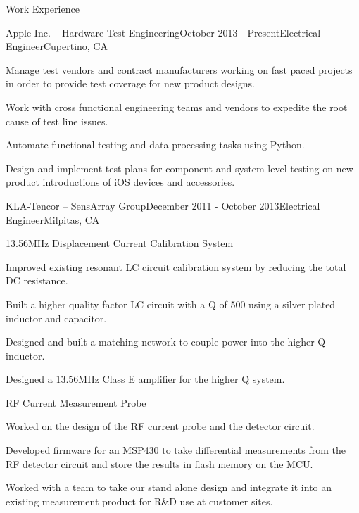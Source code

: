 \documentclass{resume} %
\begin{document}
\pagebreak[3]
\begin{rSection}{Work Experience}
\begin{rSubsection}{Apple Inc. -- Hardware Test Engineering}{October 2013 - Present}{Electrical Engineer}{Cupertino, CA}
\item Manage test vendors and contract manufacturers working on fast paced projects in order to provide test coverage for new product designs.
\item Work with cross functional engineering teams and vendors to expedite the root cause of test line issues.
\item Automate functional testing and data processing tasks using Python.
\item Design and implement test plans for component and system level testing on new product introductions of iOS devices and accessories.
\end{rSubsection}


\begin{rSubsection2}{KLA-Tencor -- SensArray Group}{December 2011 - October 2013}{Electrical Engineer}{Milpitas, CA}

\pagebreak[3]
\begin{rWorkProject}{13.56MHz Displacement Current Calibration System}
\item Improved existing resonant LC circuit calibration system by reducing the total DC resistance.
\item Built a higher quality factor LC circuit with a Q of 500 using a silver plated inductor and capacitor.
\item Designed and built a matching network to couple power into the higher Q inductor.
\item Designed a 13.56MHz Class E amplifier for the higher Q system.
\end{rWorkProject}

\pagebreak[3]
\begin{rWorkProject}{RF Current Measurement Probe}
\item Worked on the design of the RF current probe and the detector circuit.
\item Developed firmware for an MSP430 to take differential measurements from the RF detector circuit and store the results in flash memory on the MCU.
\item Worked with a team to take our stand alone design and integrate it into an existing measurement product for R\&D use at customer sites.
\end{rWorkProject}


\end{rSubsection2}
\end{rSection}
\end{document}
